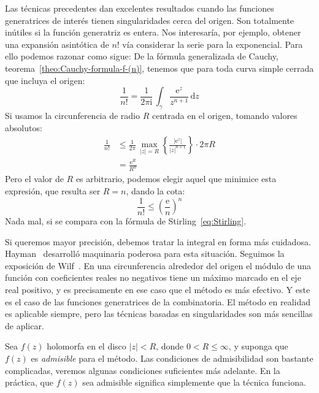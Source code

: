   Las técnicas precedentes dan excelentes resultados
  cuando las funciones generatrices de interés
  tienen singularidades cerca del origen.
  Son totalmente inútiles si la función generatriz es entera.
  Nos interesaría,
  por ejemplo,
  obtener una expansión asintótica de \(n!\)
  vía considerar la serie para la exponencial.
  Para ello podemos razonar como sigue:
  De la fórmula generalizada de Cauchy,%
  teorema~\ref{theo:Cauchy-formula-f-(n)},
  tenemos que para toda curva simple cerrada que incluya el origen:
  \begin{equation*}
    \frac{1}{n!}
      = \frac{1}{2 \pi \mathrm{i}} \,
	  \int_\gamma \frac{\mathrm{e}^z}{z^{n + 1}} \, \mathrm{d} z
  \end{equation*}
  Si usamos la circunferencia de radio \(R\) centrada en el origen,
  tomando valores absolutos:
  \begin{align*}
    \frac{1}{n!}
      &\le \frac{1}{2 \pi} \,
	     \max_{\lvert z \rvert = R}
	       \left\{
		 \frac{\lvert \mathrm{e}^z \rvert}
		      {\lvert z \rvert^{n + 1}}
	       \right\}
	     \cdot 2 \pi R \\
      &=   \frac{\mathrm{e}^R}{R^n}
  \end{align*}
  Pero el valor de \(R\) es arbitrario,
  podemos elegir aquel que minimice esta expresión,
  que resulta ser \(R = n\),
  dando la cota:
  \begin{equation*}
    \frac{1}{n!}
      \le \left( \frac{\mathrm{e}}{n} \right)^n
  \end{equation*}
  Nada mal,
  si se compara con la fórmula de Stirling~\eqref{eq:Stirling}.%

  Si queremos mayor precisión,
  debemos tratar la integral en forma más cuidadosa.
  Hayman~\cite{hayman56:_generalization_Stirling}
  desarrolló maquinaria poderosa para esta situación.
  Seguimos la exposición de Wilf~\cite{wilf06:_gfology}.
  En una circunferencia alrededor del origen
  el módulo de una función con coeficientes reales no negativos
  tiene un máximo marcado en el eje real positivo,
  y es precisamente en ese caso que el método es más efectivo.
  Y este es el caso de las funciones generatrices
  de la combinatoria.
  El método en realidad es aplicable siempre,
  pero las técnicas basadas en singularidades
  son más sencillas de aplicar.

  Sea \(f(z)\) holomorfa en el disco \(\lvert z \rvert < R\),
  donde \(0 < R \le \infty\),
  y suponga que \(f(z)\) es \emph{admisible} para el método.
  Las condiciones de admisibilidad son bastante complicadas,
  veremos algunas condiciones suficientes más adelante.
  En la práctica,
  que \(f(z)\) sea admisible
  significa simplemente que la técnica funciona.

